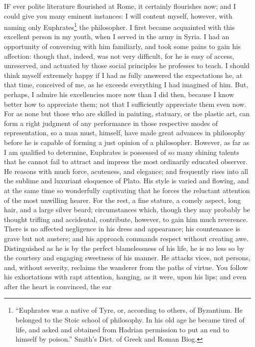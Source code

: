 IF ever polite literature flourished at Rome, it certainly flourishes now;
and I could give you many eminent instances: I will content myself,
however, with naming only Euphrates\footnote{``Euphrates was a native
of Tyre, or, according to others, of Byzantium. He belonged to the Stoic
school of philosophy. In his old age he became tired of life, and asked
and obtained from Hadrian permission to put an end to himself by poison.''
Smith's Dict. of Greek and Roman Biog.} the philosopher. I
first became acquainted with this excellent person in my youth, when I
served in the army in Syria. I had an opportunity of conversing with him
familiarly, and took some pains to gain his affection: though that,
indeed, was not very difficult, for he is easy of access, unreserved, and
actuated by those social principles he professes to teach. I should think
myself extremely happy if I had as fully answered the expectations he, at
that time, conceived of me, as he exceeds everything I had imagined of
him. But, perhaps, I admire his excellencies more now than I did then,
because I know better how to appreciate them; not that I sufficiently
appreciate them even now. For as none but those who are skilled in
painting, statuary, or the plastic art, can form a right judgment of any
performance in those respective modes of representation, so a man must,
himself, have made great advances in philosophy before he is capable of
forming a just opinion of a philosopher. However, as far as I am qualified
to determine, Euphrates is possessed of so many shining talents that he
cannot fail to attract and impress the most ordinarily educated observer.
He reasons with much force, acuteness, and elegance; and frequently rises
into all the sublime and luxuriant eloquence of Plato. His style is varied
and flowing, and at the same time so wonderfully captivating that he
forces the reluctant attention of the most unwilling hearer. For the rest,
a fine stature, a comely aspect, long hair, and a large silver beard;
circumstances which, though they may probably be thought trifling and
accidental, contribute, however, to gain him much reverence. There is no
affected negligence in his dress and appearance; his countenance is grave
but not austere; and his approach commands respect without creating awe.
Distinguished as he is by the perfect blamelessness of his life, he is no
less so by the courtesy and engaging sweetness of his manner. He attacks
vices, not persons, and, without severity, reclaims the wanderer from the
paths of virtue. You follow his exhortations with rapt attention, hanging,
as it were, upon his lips; and even after the heart is convinced, the ear
